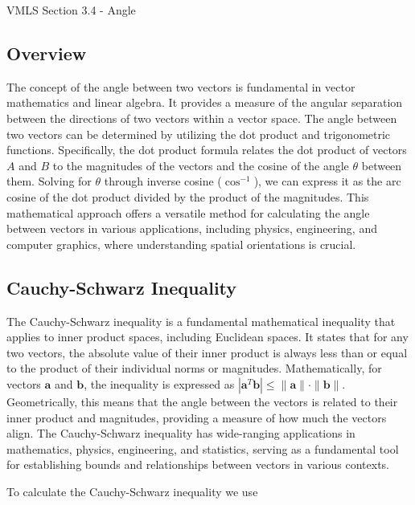 \begin{notes}{VMLS Section 3.4 - Angle}
    \subsection*{Overview}

    The concept of the angle between two vectors is fundamental in vector mathematics and linear algebra. It provides a measure of the angular separation between the directions of two vectors within a vector space. The 
    angle between two vectors can be determined by utilizing the dot product and trigonometric functions. Specifically, the dot product formula relates the dot product of vectors \(A\) and \(B\) to the magnitudes of the 
    vectors and the cosine of the angle \(θ\) between them. Solving for \(θ\) through inverse cosine (\(\cos^{-1}\)), we can express it as the arc cosine of the dot product divided by the product of the magnitudes. This 
    mathematical approach offers a versatile method for calculating the angle between vectors in various applications, including physics, engineering, and computer graphics, where understanding spatial orientations is crucial.

    \subsection*{Cauchy-Schwarz Inequality}

    The Cauchy-Schwarz inequality is a fundamental mathematical inequality that applies to inner product spaces, including Euclidean spaces. It states that for any two vectors, the absolute value of their inner product is always 
    less than or equal to the product of their individual norms or magnitudes. Mathematically, for vectors \( \mathbf{a} \) and \( \mathbf{b} \), the inequality is expressed as \( | \mathbf{a}^{T}\mathbf{b} | \leq \| \mathbf{a} \| 
    \cdot \| \mathbf{b} \| \). Geometrically, this means that the angle between the vectors is related to their inner product and magnitudes, providing a measure of how much the vectors align. The Cauchy-Schwarz inequality has 
    wide-ranging applications in mathematics, physics, engineering, and statistics, serving as a fundamental tool for establishing bounds and relationships between vectors in various contexts.

    \begin{Highlight}
        To calculate the Cauchy-Schwarz inequality we use


\end{Highlight}
\end{notes}
